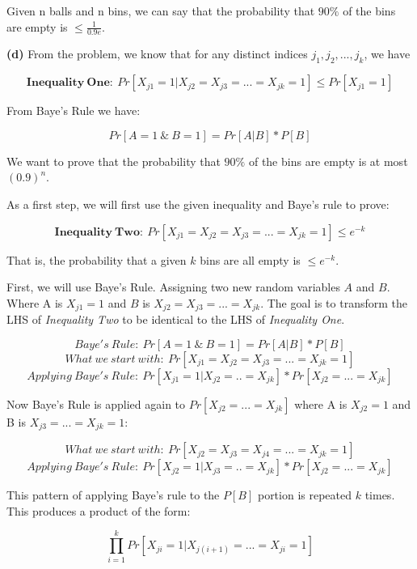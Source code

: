 \documentclass[11pt]{article}
\renewcommand\part[1]{\vspace{.10in}\textbf{(#1)}}
\begin{document}
Given n balls and n bins, we can say that the probability that $90\%$ of the bins are empty is $\leq \frac{1}{0.9e}$.


\part{d} From the problem, we know that for any distinct indices $j_1, j_2,...,j_k$, we have

$$\mathbf{Inequality \ One: \ }Pr[X_{j1} = 1 | X_{j2} = X_{j3} = ... = X_{jk} = 1] \leq Pr[X_{j1} = 1]$$

From Baye's Rule we have:

$$Pr[A = 1 \ \& \ B = 1] = Pr[A | B] * P[B]$$

We want to prove that the probability that $90\%$ of the bins are empty is at most $(0.9)^n$.

As a first step, we will first use the given inequality and Baye's rule to prove:

$$\mathbf{Inequality \ Two: \ } Pr[X_{j1} = X_{j2} = X_{j3} = ... = X_{jk} = 1] \leq e^{-k}$$

That is, the probability that a given $k$ bins are all empty is $\leq e^{-k}$.

First, we will use Baye's Rule. Assigning two new random variables $A$ and $B$. Where A is $X_{j1} = 1$ and $B$ is $X_{j2} = X_{j3} = ... = X_{jk}$. The goal is to transform the LHS of \textit{Inequality Two} to be identical to the LHS of \textit{Inequality One}.

$$Baye's \ Rule: \ Pr[A = 1 \ \& \ B = 1] = Pr[A|B] * P[B]$$
$$What \ we \ start \ with: \ Pr[X_{j1} = X_{j2} = X_{j3} = ... = X_{jk} = 1]$$
$$Applying \ Baye's \ Rule: \ Pr[X_{j1} = 1 | X_{j2} = .. = X_{jk}] * Pr[X_{j2} = ... = X_{jk}]$$

Now Baye's Rule is applied again to $Pr[X_{j2} = ... = X_{jk}]$ where A is $X_{j2} = 1$ and B is $X_{j3} = ... = X_{jk} = 1$:

$$What \ we \ start \ with: \ Pr[X_{j2} = X_{j3} = X_{j4} = ... = X_{jk} = 1]$$
$$Applying \ Baye's \ Rule: \ Pr[X_{j2} = 1 | X_{j3} = .. = X_{jk}] * Pr[X_{j2} = ... = X_{jk}]$$

This pattern of applying Baye's rule to the $P[B]$ portion is repeated $k$ times. This produces a product of the form:

$$\prod_{i = 1}^k Pr[X_{ji} = 1 | X_{j(i + 1)} = ... = X_{ji} = 1]$$
\end{document}
